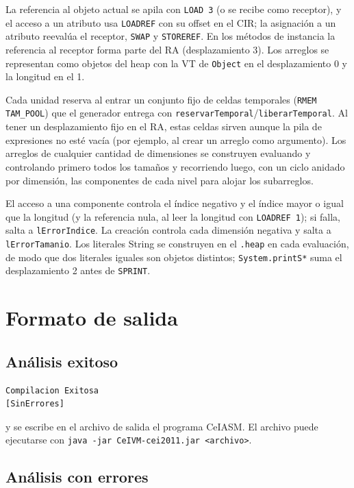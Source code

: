 \documentclass[11pt,a4paper]{article}
\begin{document}
La referencia al objeto actual se apila con \texttt{LOAD 3} (o se recibe como
receptor), y el acceso a un atributo usa \texttt{LOADREF} con su offset en el
CIR; la asignación a un atributo reevalúa el receptor, \texttt{SWAP} y
\texttt{STOREREF}. En los métodos de instancia la referencia al receptor forma
parte del RA (desplazamiento 3). Los arreglos se representan como objetos del
heap con la VT de \texttt{Object} en el desplazamiento 0 y la longitud en el 1.

Cada unidad reserva al entrar un conjunto fijo de celdas temporales
(\texttt{RMEM TAM\_POOL}) que el generador entrega con
\texttt{reservarTemporal}/\texttt{liberarTemporal}. Al tener un desplazamiento
fijo en el RA, estas celdas sirven aunque la pila de expresiones no esté vacía
(por ejemplo, al crear un arreglo como argumento). Los arreglos de cualquier
cantidad de dimensiones se construyen evaluando y controlando primero todos los
tamaños y recorriendo luego, con un ciclo anidado por dimensión, las componentes
de cada nivel para alojar los subarreglos.

El acceso a una componente controla el índice negativo y el índice mayor o igual
que la longitud (y la referencia nula, al leer la longitud con \texttt{LOADREF
1}); si falla, salta a \texttt{lErrorIndice}. La creación controla cada dimensión
negativa y salta a \texttt{lErrorTamanio}. Los literales String se construyen en
el \texttt{.heap} en cada evaluación, de modo que dos literales iguales son
objetos distintos; \texttt{System.printS*} suma el desplazamiento 2 antes de
\texttt{SPRINT}.

\section{Formato de salida}

\subsection{Análisis exitoso}

{\footnotesize
\begin{verbatim}
Compilacion Exitosa
[SinErrores]
\end{verbatim}
}

y se escribe en el archivo de salida el programa CeIASM. El archivo puede
ejecutarse con \texttt{java -jar CeIVM-cei2011.jar <archivo>}.

\subsection{Análisis con errores}
\end{document}
